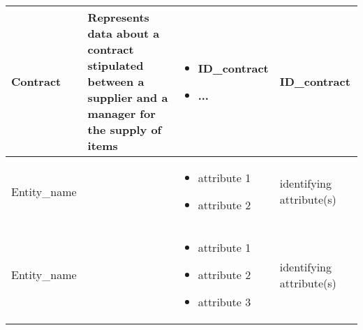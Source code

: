 \begin{longtable}{|p{}|p{} |p{}|p{} |}
Contract & Represents data about a contract stipulated between a supplier and a manager for the supply of items &
    \begin{itemize}
        \vspace{-1em}
        \item ID_contract
        \item ...
    \end{itemize}
&  ID_contract\\\hline

Entity\_name & & \begin{itemize}
        \vspace{-1em}
        \item attribute 1
        \item attribute 2
    \end{itemize}
 &  identifying attribute(s)\\\hline
 
 Entity\_name & & \begin{itemize}
        \vspace{-1em}
        \item attribute 1
        \item attribute 2
        \item attribute 3
    \end{itemize}
 &  identifying attribute(s) \\\hline

\end{longtable}